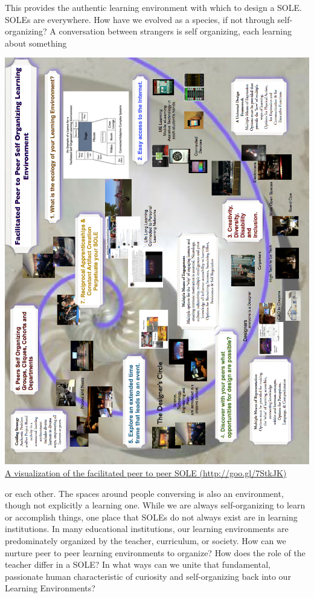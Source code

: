 This provides the authentic
learning environment with which to design a SOLE. SOLEs are everywhere.
How have we evolved as a species, if not through self-organizing? A
conversation between strangers is self organizing, each learning about
something 
\clearpage
\begin{vplace}[0.5]
\noindent \includegraphics[width=\textwidth]{../pictures/sole-l.jpg}
\href{http://goo.gl/7StkJK}{A visualization of the facilitated peer to peer SOLE (http://goo.gl/7StkJK)}
\end{vplace}
\clearpage

\noindent or each other. The spaces around people conversing is also an
environment, though not explicitly a learning one. While we are always
self-organizing to learn or accomplish things, one place that SOLEs do
not always exist are in learning institutions. In many educational
institutions, our learning environments are predominately organized by
the teacher, curriculum, or society. How can we nurture peer to peer
learning environments to organize? How does the role of the teacher
differ in a SOLE? In what ways can we unite that fundamental, passionate
human characteristic of curiosity and self-organizing back into our
Learning Environments? 

